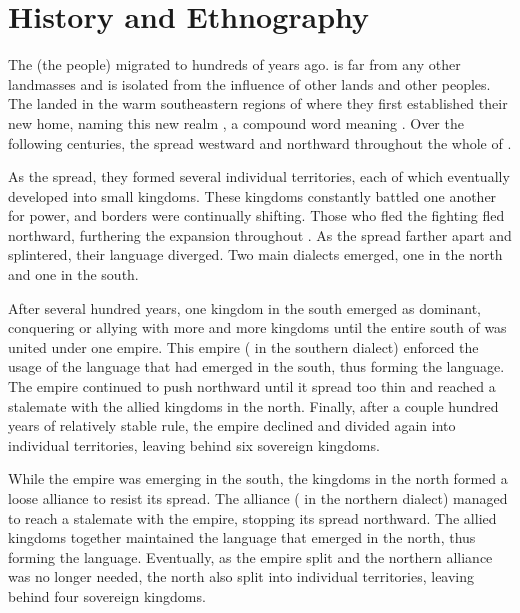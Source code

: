 \chapter{History and Ethnography}
\label{cha:tvk-ethnography}

The \peoptvk{} (the \langtvk{} people) migrated to \landn{} hundreds of years ago. \landn{} is far from any other landmasses and is isolated from the influence of other lands and other peoples. The \peoptvk{} landed in the warm southeastern regions of \landn{} where they first established their new home, naming this new realm , a compound word meaning . Over the following centuries, the \peoptvk{} spread westward and northward throughout the whole of \landn.

As the \peoptvk{} spread, they formed several individual territories, each of which eventually developed into small kingdoms. These kingdoms constantly battled one another for power, and borders were continually shifting. Those who fled the fighting fled northward, furthering the \langtvk{} expansion throughout \landn. As the \peoptvk{} spread farther apart and splintered, their language diverged. Two main dialects emerged, one in the north and one in the south.

After several hundred years, one kingdom in the south emerged as dominant, conquering or allying with more and more kingdoms until the entire south of \landn{} was united under one empire. This empire ( in the southern dialect) enforced the usage of the language that had emerged in the south, thus forming the \langank{} language. The empire continued to push northward until it spread too thin and reached a stalemate with the allied kingdoms in the north. Finally, after a couple hundred years of relatively stable rule, the empire declined and divided again into individual territories, leaving behind six sovereign kingdoms.

While the empire was emerging in the south, the kingdoms in the north formed a loose alliance to resist its spread. The alliance ( in the northern dialect) managed to reach a stalemate with the empire, stopping its spread northward. The allied kingdoms together maintained the language that emerged in the north, thus forming the \langrdk{} language. Eventually, as the empire split and the northern alliance was no longer needed, the north also split into individual territories, leaving behind four sovereign kingdoms.